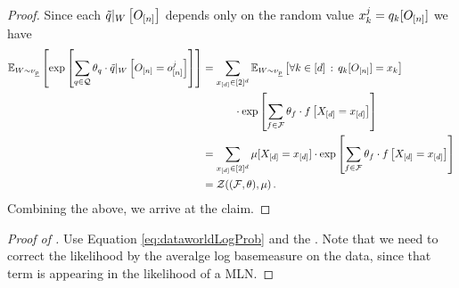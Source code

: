 \begin{proof}
	Since each ${\tilde{q}}|_{W} \left[O_{[n]}\right]$ depends only on the random value $x_{k}^j=q_{k}[O_{[n]}]$ we have
	\begin{align*}
		\mathbb{E}_{W\sim\nu_{\underline{p}}}\left[
			\mathrm{exp}\left[ \sum_{q\in\mathcal{Q}} \theta_{q} \cdot {\tilde{q}}|_{W} \left[O_{[n]} = o_{[n]}^{j}\right] \right]
		\right] 
		& = \sum_{x_{[d]} \in [2]^d} 
		\mathbb{E}_{W\sim\nu_{\underline{p}}}\left[\forall {k\in[d]} \, : \, q_{k}[O_{[n]}]=x_{k}\right] \\
		& \quad \quad \quad  \cdot 
		\mathrm{exp}\left[\sum_{f\in\mathcal{F}} \theta_{f} \cdot f\left[X_{[d]}=x_{[d]}\right]\right]
		 \\
		& = \sum_{x_{[d]} \in [2]^d} \mu[X_{[d]}=x_{[d]}] \cdot 
		\mathrm{exp}\left[\sum_{f\in\mathcal{F}} \theta_{f} \cdot f\left[X_{[d]}=x_{[d]}\right]\right]
		 \\
		& = \mathcal{Z}{\left((\mathcal{F},\theta), \mu\right)} \, . 
	\end{align*}
	Combining the above, we arrive at the claim.
\end{proof}

\begin{proof}[Proof of ]
	Use Equation \ref{eq:dataworldLogProb} and the .
	Note that we need to correct the likelihood by the averalge log basemeasure on the data, since that term is appearing in the likelihood of a MLN.
\end{proof}


